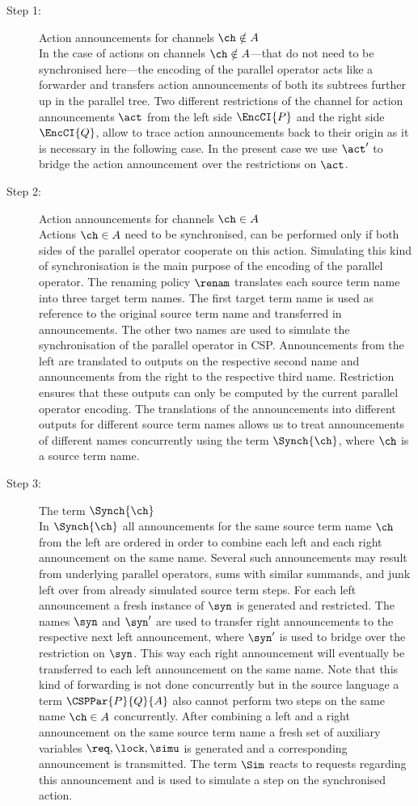 \documentclass[copyright,creativecommons]{eptcs}
\begin{document}
\begin{description}
	\item[Step 1:] Action announcements for channels $ \ch \notin A $\\
		In the case of actions on channels $ \ch \notin A $---that do not need to be synchronised here---the encoding of the parallel operator acts like a forwarder and transfers action announcements of both its subtrees further up in the parallel tree.
		Two different restrictions of the channel for action announcements $ \act $ from the left side $ \EncCI{P} $ and the right side $ \EncCI{Q} $, allow to trace action announcements back to their origin as it is necessary in the following case.
		In the present case we use $ \act' $ to bridge the action announcement over the restrictions on $ \act $.
	\item[Step 2:] Action announcements for channels $ \ch \in A $\\
		Actions $ \ch \in A $ need to be synchronised, \ie can be performed only if both sides of the parallel operator cooperate on this action. Simulating this kind of synchronisation is the main purpose of the encoding of the parallel operator.
		The renaming policy $ \renam $ translates each source term name into three target term names. The first target term name is used as reference to the original source term name and transferred in announcements. The other two names are used to simulate the synchronisation of the parallel operator in CSP. Announcements from the left are translated to outputs on the respective second name and announcements from the right to the respective third name. Restriction ensures that these outputs can only be computed by the current parallel operator encoding. The translations of the announcements into different outputs for different source term names allows us to treat announcements of different names concurrently using the term $ \Synch{\ch} $, where $ \ch $ is a source term name.
	\item[Step 3:] The term $ \Synch{\ch} $\\
		In $ \Synch{\ch} $ all announcements for the same source term name $ \ch $ from the left are ordered in order to combine each left and each right announcement on the same name. Several such announcements may result from underlying parallel operators, sums with similar summands, and junk left over from already simulated source term steps. For each left announcement a fresh instance of $ \syn $ is generated and restricted. The names $ \syn $ and $ \syn' $ are used to transfer right announcements to the respective next left announcement, where $ \syn' $ is used to bridge over the restriction on $ \syn $. This way each right announcement will eventually be transferred to each left announcement on the same name. Note that this kind of forwarding is not done concurrently but in the source language a term $ \CSPPar{P}{Q}{A} $ also cannot perform two steps on the same name $ \ch \in A $ concurrently. After combining a left and a right announcement on the same source term name a fresh set of auxiliary variables $ \req, \lock, \simu $ is generated and a corresponding announcement is transmitted. The term $ \Sim $ reacts to requests regarding this announcement and is used to simulate a step on the synchronised action.

\end{description}
\end{document}
